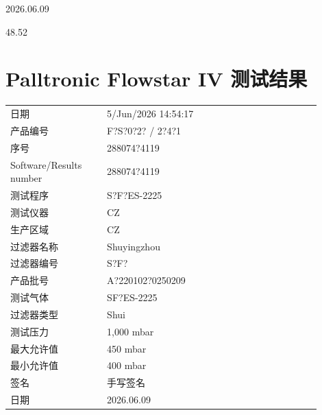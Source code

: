 \documentclass[UTF8,10pt,a4paper,fontset=fandol]{ctexart}
\newcommand{\fieldvalue}[1]{#1}
\newcommand{\handwritten}[1]{#1}
\begin{document}
\bigskip

\handwritten{2026.06.09}

\bigskip

\handwritten{48.52}

\newpage

\section*{Palltronic Flowstar IV 测试结果}

\begin{tabular}{@{}p{0.28\linewidth}p{0.62\linewidth}@{}}
日期 &
\fieldvalue{5/Jun/2026 14:54:17}
\\[2pt]
产品编号 &
\fieldvalue{F?S?0?2? / 2?4?1}
\\[2pt]
序号 &
\fieldvalue{288074?4119}
\\[2pt]
Software/Results number &
\fieldvalue{288074?4119}
\\[2pt]
测试程序 &
\fieldvalue{S?F?ES-2225}
\\[2pt]
测试仪器 &
\fieldvalue{CZ}
\\[2pt]
生产区域 &
\fieldvalue{CZ}
\\[2pt]
过滤器名称 &
\fieldvalue{Shuyingzhou}
\\[2pt]
过滤器编号 &
\fieldvalue{S?F?}
\\[2pt]
产品批号 &
\fieldvalue{A?220102?0250209}
\\[2pt]
测试气体 &
\fieldvalue{SF?ES-2225}
\\[2pt]
过滤器类型 &
\fieldvalue{Shui}
\\[2pt]
测试压力 &
\fieldvalue{1,000 mbar}
\\[2pt]
最大允许值 &
\fieldvalue{450 mbar}
\\[2pt]
最小允许值 &
\fieldvalue{400 mbar}
\\[2pt]
签名 &
\fieldvalue{\handwritten{手写签名}}
\\[2pt]
日期 &
\fieldvalue{\handwritten{2026.06.09}}
\end{tabular}
\end{document}
